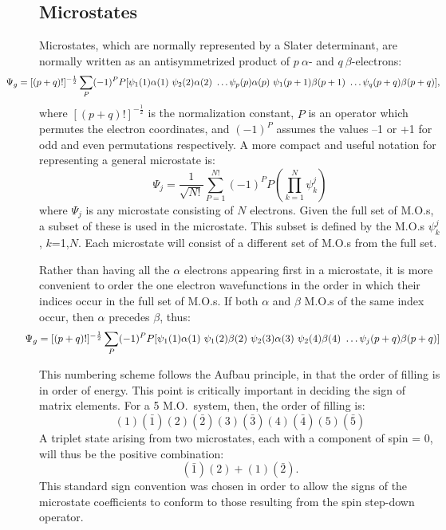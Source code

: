 \subsection{Microstates} \label{sd}
Microstates, which are normally represented by a Slater determinant, are
normally written as an antisymmetrized product of $p\  \alpha$- and $q\
\beta$-electrons:
$$
\hspace*{-0.5in} \Psi_g=[(p+q)!]^{-\frac{1}{2}}\sum_P(-1)^PP[\psi_1(1)\alpha(1)\ \psi_2(2)\alpha(2)\
\ldots \psi_p(p)\alpha(p)\ \psi_1(p+1)\beta(p+1)\ \ldots \psi_q(p+q)\beta(p+q)],
$$
where $[(p+q)!]^{-\frac{1}{2}}$ is the normalization constant, $P$ is an
operator which permutes the electron coordinates, and $(-1)^P$ assumes the
values --1 or +1 for odd and even permutations respectively.  A more compact
and useful notation for representing a  general microstate is:
$$
\Psi_j = \frac{1}{\sqrt{N!}}\sum_{P=1}^{N!}(-1)^PP(\prod_{k=1}^N\psi_k^j)
$$
where $\Psi_j$ is any microstate consisting of $N$ electrons.  Given the full
set of M.O.s, a subset of these is used in the microstate.  This subset is
defined by the M.O.s $\psi_k^j$, $k$=1,$N$.  Each microstate will consist of a
different set of M.O.s from the full set.

Rather than having all the $\alpha$ electrons appearing first in a microstate,
it is more convenient to order the one electron wavefunctions in the order in
which their indices occur in the full set of M.O.s.  If both $\alpha$ and
$\beta$ M.O.s of the same index occur, then $\alpha$ precedes $\beta$, thus:
$$
\hspace*{-0.2in}\Psi_g=[(p+q)!]^{-\frac{1}{2}}\sum_P(-1)^PP[\psi_1(1)\alpha(1)\ \psi_1(2)\beta(2)\
\psi_2(3)\alpha(3)\ \psi_2(4)\beta(4)\ \ldots  \psi_j(p+q)\beta(p+q)]
$$

This numbering scheme follows  the  Aufbau  principle, in that the  order  of
 filling is in order of energy.  This point is
critically  important  in deciding  the  sign of matrix elements.  For a 5
M.O.\  system, then, the order of filling is:
$$      (1)(\bar{1})(2)(\bar{2})(3)(\bar{3})(4)(\bar{4})(5)(\bar{5}) $$
A triplet state arising from two microstates, each with a component
of spin = 0, will thus be the positive combination:
$$        (\bar{1})(2)   +    (1)(\bar{2}). $$
 This standard sign convention was chosen in order to allow the signs of the
microstate coefficients  to  conform  to those resulting from the spin
step-down operator.

